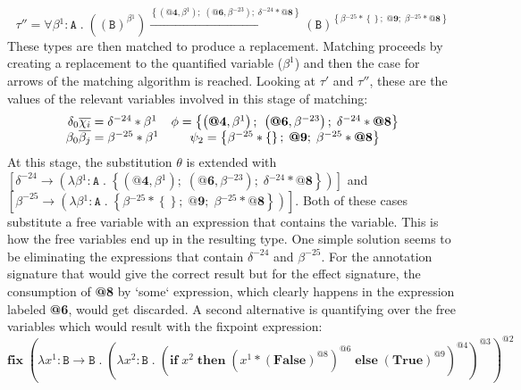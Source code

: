 \documentclass[8pt]{extarticle}
\begin{document}
\[
\tau'' = \forall{}\beta{}^{1}:\mathtt{A}\;{}.\;{}\left(\left(\mathtt{B}\right)^{\beta{}^{1}}\right)\xrightarrow{\left\{\left(\textbf{@4},\beta{}^{1}\right);\;{}\left(\textbf{@6},\beta{}^{-23}\right);\;{}\delta{}^{-24}*\textbf{@8}\right\}}\left(\mathtt{B}\right)^{\left\{\beta{}^{-25}*\left\{\right\};\;{}\textbf{@9};\;{}\beta{}^{-25}*\textbf{@8}\right\}}
\]
These types are then matched to produce a replacement. Matching proceeds by creating a replacement to the quantified variable ($\beta^1$) and then the case for arrows of the matching algorithm is reached. Looking at $\tau'$ and $\tau''$, these are the values of the relevant variables involved in this stage of matching:
\[
\begin{array}{c c}
\delta_0\overline{\chi_i}=\delta{}^{-24}*\beta{}^{1} & \phi = \left\{\left(\textbf{@4},\beta{}^{1}\right);\;{}\left(\textbf{@6},\beta{}^{-23}\right);\;{}\delta{}^{-24}*\textbf{@8}\right\} \\
\beta_0\overline{\beta_j}=\beta{}^{-25}*\beta{}^{1} & \psi_2=\left\{\beta{}^{-25}*\left\{\right\};\;{}\textbf{@9};\;{}\beta{}^{-25}*\textbf{@8}\right\}
\end{array}
\]
At this stage, the substitution $\theta$ is extended with $\left[\delta^{-24}\to{}\left(\lambda{}\beta{}^{1}:\mathtt{A}\;{}.\;{}\left\{\left(\textbf{@4},\beta{}^{1}\right);\;{}\left(\textbf{@6},\beta{}^{-23}\right);\;{}\delta{}^{-24}*\textbf{@8}\right\}\right)\right]$ and\\ $\left[\beta^{-25}\to{}\left(\lambda{}\beta{}^{1}:\mathtt{A}\;{}.\;{}\left\{\beta{}^{-25}*\left\{\right\};\;{}\textbf{@9};\;{}\beta{}^{-25}*\textbf{@8}\right\}\right)\right]$. Both of these cases substitute a free variable with an expression that contains the variable. This is how the free variables end up in the resulting type. One simple solution seems to be eliminating the expressions that contain $\delta^{-24}$ and $\beta^{-25}$. For the annotation signature that would give the correct result but for the effect signature, the consumption of {\bf @8} by `some` expression, which clearly happens in the expression labeled {\bf @6}, would get discarded. A second alternative is quantifying over the free variables which would result with the fixpoint expression:
\[
\mathbf{fix}\;{}\left(\lambda{}x^{1}:\mathtt{B}\to{}\mathtt{B}\;{}.\;{}\left(\lambda{}x^{2}:\mathtt{B}\;{}.\;{}\left(\mathbf{if}\;{}x^{2}\;{}\mathbf{then}\;{}\left(x^{1}*\left(\mathbf{False}\right)^{\mathit{@8}}\right)^{\mathit{@6}}\;{}\mathbf{else}\;{}\left(\mathbf{True}\right)^{\mathit{@9}}\right)^{\mathit{@4}}\right)^{\mathit{@3}}\right)^{\mathit{@2}}
\]
\end{document}
